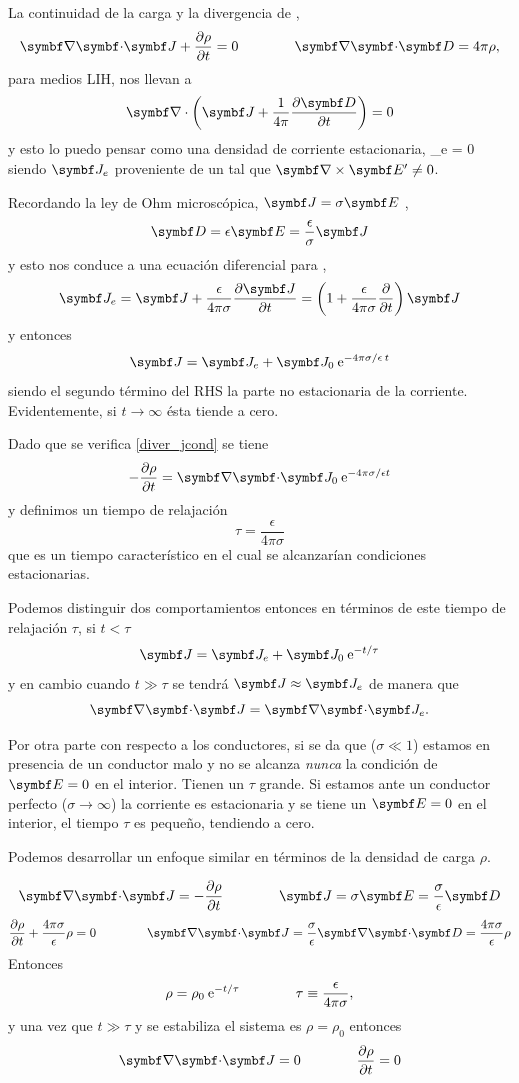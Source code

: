 \documentclass[10pt,oneside]{CBFT_book}
\begin{document}
La continuidad de la carga y la divergencia de ,
\[
	\divem{J} + \dpar{\rho}{t} = 0 \qquad \qquad \divem{D} = 4\pi \rho,
\]
para medios LIH, nos llevan a
\[
	\Nabla\cdot \left( \vb{J} + \frac{1}{4\pi} \dpar{\vb{D}}{t} \right) = 0
\]
y esto lo puedo pensar como una densidad de corriente estacionaria,
\be
	_e = 0
	\label{diver_jcond}
\ee
siendo $\vb{J}_e$ proveniente de un  tal que $\rotorm{E'} \neq 0$.

Recordando la ley de Ohm microscópica, $\vb{J} = \sigma \vb{E}$ ,
\[
	\vb{D} = \epsilon \vb{E} = \frac{\epsilon}{\sigma} \vb{J}
\]
y esto nos conduce a una ecuación diferencial para ,
\[
	\vb{J}_e = \vb{J} + \frac{\epsilon}{4\pi\sigma} \dpar{\vb{J}}{t} =
	\left( 1 + \frac{\epsilon}{4\pi\sigma} \dpar{}{t} \right)\vb{J}
\]
y entonces 
\[
	\vb{J} = \vb{J}_e + \vb{J}_0 \euler^{-4\pi\sigma/\epsilon \: t }
\]
siendo el segundo término del RHS la parte no estacionaria de la corriente. 
Evidentemente, si $t \to \infty$ ésta tiende a cero.

Dado que se verifica \eqref{diver_jcond} se tiene 
\[
	-\dpar{\rho}{t} = \divem{J}_0 \euler^{-4\pi \sigma/\epsilon t}
\]
y definimos un tiempo de relajación
\[
	\tau = \frac{\epsilon}{4\pi\sigma}
\]
que es un tiempo característico en el cual se alcanzarían condiciones estacionarias.

Podemos distinguir dos comportamientos entonces en términos de este tiempo de relajación $\tau$, si $t<\tau$
\[
	\vb{J} = \vb{J}_e + \vb{J}_0 \euler^{-t/\tau}
\]
y en cambio cuando $t \gg \tau$ se tendrá $\vb{J} \approx \vb{J}_e$ de manera que 
\[
	\divem{J} = \divem{J}_e.
\]

Por otra parte con respecto a los conductores, si se da que  ($\sigma \ll 1$) estamos en presencia de un conductor malo 
y no se alcanza {\it nunca} la condición de $\vb{E}=0$ en el interior. Tienen un $\tau$ grande. Si estamos ante un 
conductor perfecto ($\sigma \to \infty$) la corriente es estacionaria y se tiene un $\vb{E}=0$ en el interior, el 
tiempo $\tau$ es pequeño, tendiendo a cero.

Podemos desarrollar un enfoque similar en términos de la densidad de carga $\rho$.

\[
	\divem{J} = - \dpar{\rho}{t}  \qquad \qquad \vb{J} = \sigma \vb{E} = \frac{\sigma}{\epsilon}\vb{D}
\]
\[
	\dpar{\rho}{t} + \frac{4\pi\sigma}{\epsilon} \rho = 0 \qquad \qquad 
			\divem{J} = \frac{\sigma}{\epsilon} \divem{D} = \frac{4\pi\sigma}{\epsilon} \rho
\]
Entonces 
\[
	\rho = \rho_0 \:\mathrm{e}^{-t / \tau } \qquad \qquad \tau \equiv \frac{\epsilon}{4\pi\sigma} ,
\]
y una vez que $t \gg \tau$ y se estabiliza el sistema es $\rho=\rho_0$ entonces 
\[
	\divem{J} = 0 \qquad\qquad \dpar{\rho}{t} = 0
\]
\end{document}
